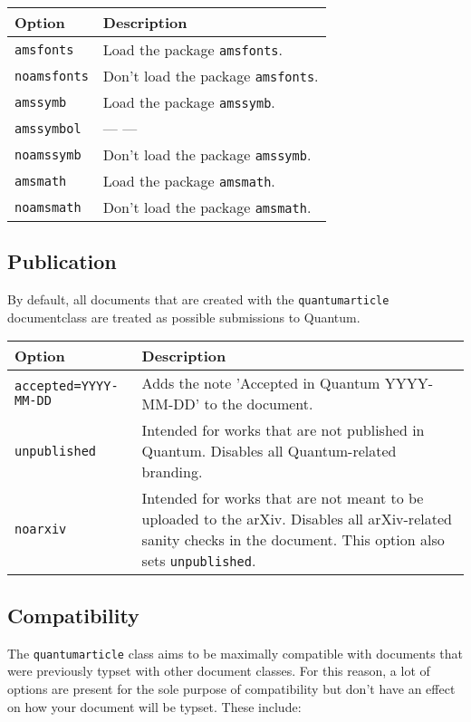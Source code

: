 \documentclass[a4paper,noarxiv,onecolumn]{quantumarticle}
\newcommand*{\ditto}{--- \raisebox{-0.5ex}{''} ---}
\newenvironment{options}
	{\medskip\noindent\begin{longtable}{p{.20\columnwidth}p{.744\columnwidth}}
	\textsf{Option} & \textsf{Description} \\
	\midrule
	}
	{\bottomrule\end{longtable}}
\newcommand{\option}[2]{
	\small\texttt{#1} & {\small#2} \\
}
\newcommand{\compatibilityoption}[2]{
	\small\texttt{\textcolor{quantumgray}{#1}} & \small\textcolor{quantumgray}{#2} \\
}
\begin{document}
	\begin{options}
		\option{amsfonts}{
			Load the package \texttt{amsfonts}.
		}
		\compatibilityoption{noamsfonts}{
			Don't load the package \texttt{amsfonts}.
		}
		\option{amssymb}{
			Load the package \texttt{amssymb}.
		}
		\option{amssymbol}{
			\ditto
		}
		\compatibilityoption{noamssymb}{
			Don't load the package \texttt{amssymb}.
		}
		\option{amsmath}{
			Load the package \texttt{amsmath}.
		}
		\compatibilityoption{noamsmath}{
			Don't load the package \texttt{amsmath}.
		}
	\end{options}

	\subsection{Publication}
	By default, all documents that are created with the \texttt{quantumarticle} documentclass are treated as possible submissions to Quantum. 
	
	\begin{options}
		\option{accepted=YYYY-MM-DD}{
			Adds the note 'Accepted in Quantum YYYY-MM-DD' to the document.
		}
		\option{unpublished}{
			Intended for works that are not published in Quantum. Disables all Quantum-related branding.
		}
		\option{noarxiv}{
			Intended for works that are not meant to be uploaded to the arXiv. Disables all arXiv-related sanity checks in the document. This option also sets \texttt{unpublished}.
		}
	\end{options}

	\subsection{Compatibility}
	The \texttt{quantumarticle} class aims to be maximally compatible with documents that were previously typset with other document classes. For this reason, a lot of options are present for the sole purpose of compatibility but don't have an effect on how your document will be typset. These include:
	
\end{document}
